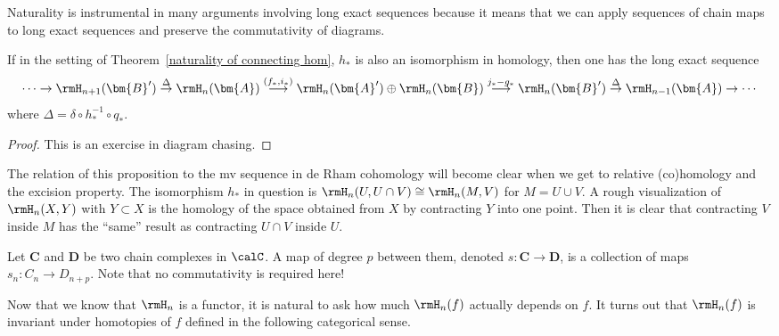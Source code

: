 Naturality is instrumental in many arguments involving long exact sequences because it means that we can apply sequences of chain maps to long exact sequences and preserve the commutativity of diagrams.

\begin{prop}\label{prop algebraic MV}
    If in the setting of Theorem~\ref{naturality of connecting hom}, $h_\ast$ is also an isomorphism in homology, then one has the long exact sequence
    \[\cdots \to \rmH_{n+1}(\bm{B}')\overset\Delta\to \rmH_n(\bm{A})\overset{(f_\ast,i_\ast)}\longrightarrow \rmH_n(\bm{A}')\oplus \rmH_n(\bm{B})\overset{j_\ast- g_\ast}\longrightarrow \rmH_n(\bm{B}')\overset{\Delta}\to \rmH_{n-1}(\bm{A})\to \cdots\]
    where $\Delta=\delta \circ h_\ast^{-1}\circ q_\ast$.
\end{prop}
\begin{proof}
     This is an exercise in diagram chasing.
\end{proof}

The relation of this proposition to the \gls{mv} sequence in de Rham cohomology will become clear when we get to relative (co)homology and the excision property. The isomorphism $h_\ast$ in question is $\rmH_n(U,U\cap V)\cong \rmH_n(M,V)$ for $M=U\cup V$. A rough visualization of $\rmH_n(X,Y)$ with $Y\subset X$ is the homology of the space obtained from $X$ by contracting $Y$ into one point. Then it is clear that contracting $V$ inside $M$ has the ``same'' result as contracting $U\cap V$ inside $U$. 


\begin{defn}
    Let $\bm{C}$ and $\bm{D}$ be two chain complexes in $\calC$. A map of degree $p$ between them, denoted $s:\bm{C}\to \bm{D}$, is a collection of maps $s_n:C_n\to D_{n+p}$. Note that no commutativity is required here!
\end{defn}


Now that we know that $\rmH_n$ is a functor, it is natural to ask how much $\rmH_n(f)$ actually depends on $f$. It turns out that $\rmH_n(f)$ is invariant under homotopies of $f$ defined in the following categorical sense.


